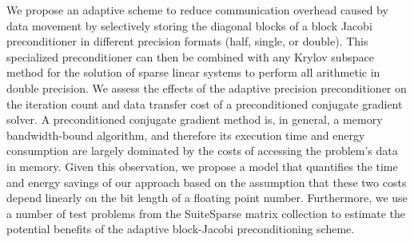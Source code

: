 We propose an adaptive scheme to reduce communication overhead caused by data
movement by selectively storing the diagonal blocks of a block Jacobi 
preconditioner
in different precision formats (half, single, or double). This specialized
preconditioner can then be combined with any Krylov subspace method for the
solution of sparse linear systems to perform all arithmetic in double
precision. We assess the effects of the adaptive precision preconditioner on the
iteration count and data transfer cost of a preconditioned conjugate gradient 
solver. A preconditioned conjugate gradient method is, in general, a memory 
bandwidth-bound algorithm, and therefore
its execution time and energy consumption are largely dominated by the costs of
accessing the problem's data in memory. Given this observation, we propose a
model that quantifies the time and energy savings of our approach based on the
assumption that these two costs depend linearly on the bit length of a floating
point number. Furthermore, we use a number of test problems from the SuiteSparse
matrix collection to estimate the potential benefits of the adaptive
block-Jacobi preconditioning scheme.
